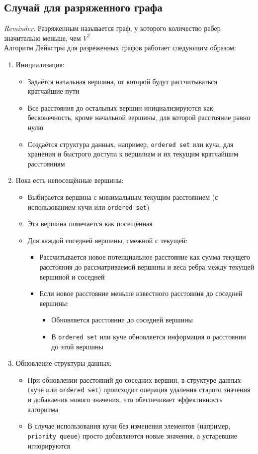\documentclass[a4paper]{article}
\newcommand{\code}[1]{\colorbox{codegray}{\texttt{#1}}}
\begin{document}
\subsection*{Случай для разряженного графа}
\indent \textit{Reminder.} Разряженным называется граф, у которого количество ребер значительно меньше, чем $V^2$ \\[2mm]
Алгоритм Дейкстры для разреженных графов работает следующим образом:
\begin{enumerate}
    \item Инициализация:
    \begin{itemize}
        \item Задаётся начальная вершина, от которой будут рассчитываться кратчайшие пути
        \item Все расстояния до остальных вершин инициализируются как бесконечность, кроме начальной вершины, для которой расстояние равно нулю
        \item Создаётся структура данных, например, \code{ordered set} или куча, для хранения и быстрого доступа к вершинам и их текущим кратчайшим расстояниям
    \end{itemize}
    \item Пока есть непосещённые вершины:
    \begin{itemize}
        \item Выбирается вершина с минимальным текущим расстоянием (с использованием кучи или \code{ordered set})
        \item Эта вершина помечается как посещённая
        \item Для каждой соседней вершины, смежной с текущей:
        \begin{itemize}
            \item Рассчитывается новое потенциальное расстояние как сумма текущего расстояния до рассматриваемой вершины и веса ребра между текущей вершиной и соседней
            \item Если новое расстояние меньше известного расстояния до соседней вершины:
            \begin{itemize}
                \item Обновляется расстояние до соседней вершины
                \item В \code{ordered set} или куче обновляется информация о расстоянии до этой вершины
            \end{itemize}
        \end{itemize}
    \end{itemize}
    \item Обновление структуры данных:
    \begin{itemize}
        \item При обновлении расстояний до соседних вершин, в структуре данных (куче или \code{ordered set}) происходит операция удаления старого значения и добавления нового значения, что обеспечивает эффективность алгоритма
        \item В случае использования кучи без изменения элементов (например, \code{priority queue}) просто добавляются новые значения, а устаревшие игнорируются
    \end{itemize}
\end{enumerate}
\end{document}
